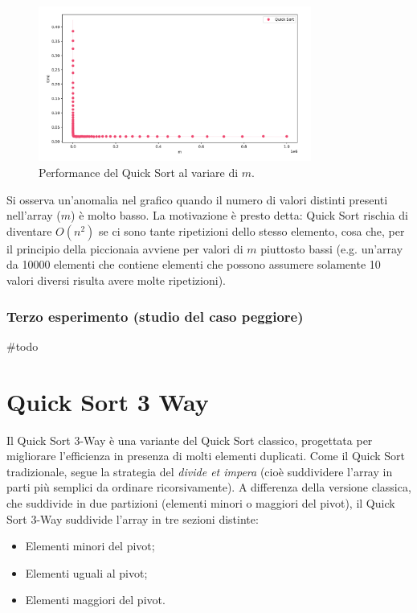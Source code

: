\documentclass[a4paper, 12pt, oneside]{book}
\begin{document}
\begin{figure}[H]
    \centering
    \includegraphics[width=0.8\textwidth]{images/grafico_quick_sort_m.png}
    \caption{Performance del Quick Sort al variare di \(m\).}
    \label{fig:quick_sort_m}
\end{figure}

\noindent Si osserva un'anomalia nel grafico quando il numero di valori distinti presenti nell'array (\(m\)) è molto basso. La motivazione è presto detta: Quick Sort rischia di diventare $O(n^2)$ se ci sono tante ripetizioni dello stesso elemento, cosa che, per il principio della piccionaia avviene per valori di $m$ piuttosto bassi (e.g. un'array da 10000 elementi che contiene elementi che possono assumere solamente 10 valori diversi risulta avere molte ripetizioni).

\subsection{Terzo esperimento (studio del caso peggiore)}
#todo 


\chapter{Quick Sort 3 Way}\label{chap:Quick Sort 3 Way} %

Il Quick Sort 3-Way è una variante del Quick Sort classico, progettata per migliorare l'efficienza in presenza di molti elementi duplicati. Come il Quick Sort tradizionale, segue la strategia del \textit{divide et impera} (cioè suddividere l'array in parti più semplici da ordinare ricorsivamente).
A differenza della versione classica, che suddivide in due partizioni (elementi minori o maggiori del pivot), il Quick Sort 3-Way suddivide l'array in tre sezioni distinte:

\begin{itemize}
    \item Elementi minori del pivot;
    \item Elementi uguali al pivot;
    \item Elementi maggiori del pivot.
\end{itemize}
\end{document}
